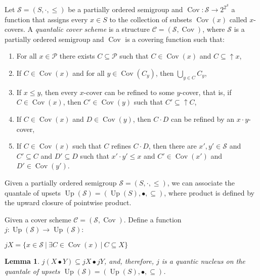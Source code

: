 \documentclass[a4paper]{article}
\theoremstyle{defin}
\theoremstyle{theorem}
\theoremstyle{claim}
\theoremstyle{prop}
\theoremstyle{lemma}
\newtheorem{lemma}{Lemma}
\theoremstyle{fact}
\theoremstyle{ex}
\theoremstyle{col}
\begin{document}
Let $\mathcal{S} = (S, \cdot, \leq)$ be a partially ordered semigroup and $\operatorname{Cov} : \mathcal{S} \to 2^{2^{\mathcal{S}}}$ a function that assigns every $x \in S$ to the collection of subsets $\operatorname{Cov}(x)$ called $x$-covers. A \emph{quantalic cover scheme} is a structure $\mathcal{C} = (\mathcal{S}, \operatorname{Cov})$, where $\mathcal{S}$ is a partially ordered semigroup and $\operatorname{Cov}$ is a covering function such that:
\begin{enumerate}
\item For all $x \in \mathcal{P}$ there exists $C \subseteq \mathcal{P}$ such that $C \in \operatorname{Cov}(x)$ and $C \subseteq \uparrow x$,
\item If $C \in \operatorname{Cov}(x)$ and for all $y \in \operatorname{Cov}(C_y)$, then $\bigcup \limits_{y \in C} C_y$,
\item If $x \leq y$, then every $x$-cover can be refined to some $y$-cover, that is, if $C \in \operatorname{Cov}(x)$, then $C' \in \operatorname{Cov}(y)$ such that $C' \subseteq \uparrow C$,
\item If $C \in \operatorname{Cov}(x)$ and $D \in \operatorname{Cov}(y)$, then $C \cdot D$ can be refined by an $x \cdot y$-cover,
\item If $C \in \operatorname{Cov}(x)$ such that $C$ refines $C \cdot D$, then there are $x', y' \in \mathcal{S}$ and $C' \subseteq C$ and $D' \subseteq D$ such that $x' \cdot y' \leq x$ and $C' \in \operatorname{Cov}(x')$ and $D' \in \operatorname{Cov}(y')$.
\end{enumerate}

Given a partially ordered semigroup $\mathcal{S} = (S, \cdot, \leq)$, we can associate the quantale of upsets $\operatorname{Up}(\mathcal{S}) = (\operatorname{Up}(S), \bullet, \subseteq)$, where product is defined by the upward closure of pointwise product.

Given a cover scheme $\mathcal{C} = (\mathcal{S}, \operatorname{Cov})$. Define a function $j : \operatorname{Up}(\mathcal{S}) \to \operatorname{Up}(\mathcal{S})$:
\begin{center}
$j X = \{ x \in \mathcal{S} \: | \: \exists C \in \operatorname{Cov}(x) \: | \: C \subseteq X \}$
\end{center}

\begin{lemma}
$j (X \bullet Y) \subseteq j X \bullet j Y$, and, therefore, $j$ is a quantic nucleus on the quantale of upsets $\operatorname{Up}(\mathcal{S}) = (\operatorname{Up}(S), \bullet, \subseteq)$.
\end{lemma}
\end{document}
